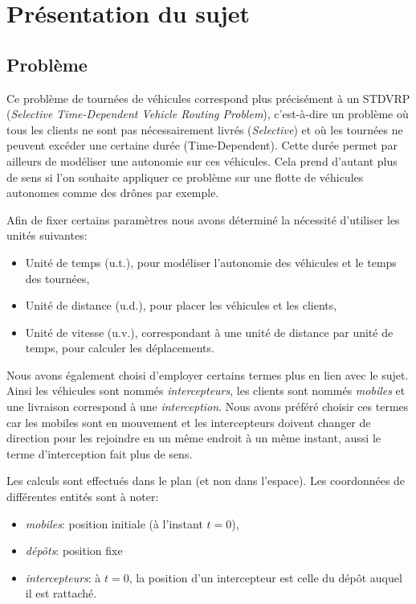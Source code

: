 \chapter{Présentation du sujet}
    \section{Problème}
    	Ce problème de tournées de véhicules correspond plus précisément à un STDVRP (\emph{Selective Time-Dependent Vehicle Routing Problem}), c'est-à-dire un problème où tous les clients ne sont pas nécessairement livrés (\emph{Selective}) et où les tournées ne peuvent excéder une certaine durée (Time-Dependent). Cette durée permet par ailleurs de modéliser une autonomie sur ces véhicules. Cela prend d'autant plus de sens si l'on souhaite appliquer ce problème sur une flotte de véhicules autonomes comme des drônes par exemple.

    	Afin de fixer certains paramètres nous avons déterminé la nécessité d'utiliser les unités suivantes:
    	\begin{itemize}
    		\item Unité de temps (u.t.), pour modéliser l'autonomie des véhicules et le temps des tournées,
    		\item Unité de distance (u.d.), pour placer les véhicules et les clients,
    		\item Unité de vitesse (u.v.), correspondant à une unité de distance par unité de temps, pour calculer les déplacements.
    	\end{itemize}

    	Nous avons également choisi d'employer certains termes plus en lien avec le sujet. Ainsi les véhicules sont nommés \emph{intercepteurs}, les clients sont nommés \emph{mobiles} et une livraison correspond à une \emph{interception}. Nous avons préféré choisir ces termes car les mobiles sont en mouvement et les intercepteurs doivent changer de direction pour les rejoindre en un même endroit à un même instant, aussi le terme d'interception fait plus de sens.

    	Les calculs sont effectués dans le plan (et non dans l'espace). Les coordonnées de différentes entités sont à noter:
    	\begin{itemize}
    		\item \emph{mobiles}: position initiale (à l'instant $t=0$),
    		\item \emph{dépôts}: position fixe
    		\item \emph{intercepteurs}: à $t=0$, la position d'un intercepteur est celle du dépôt auquel il est rattaché.
    	\end{itemize}

